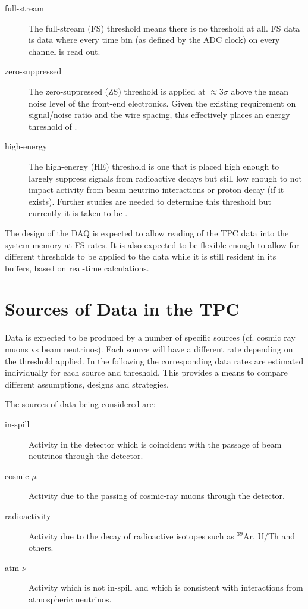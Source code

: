 \begin{description}
\item[full-stream] The full-stream (FS) threshold means there is no threshold at all.
FS data is data where every time bin (as defined by the ADC clock) on every channel is read out.
\item[zero-suppressed] The zero-suppressed (ZS) threshold is applied
  at $\approx 3\sigma$ above the mean noise level of the front-end electronics.
  Given the existing requirement on signal/noise ratio and the wire spacing,
  this effectively places an energy threshold of  \chargezsthreshold.
\item[high-energy] The high-energy (HE) threshold is one that is
  placed high enough to largely suppress signals from radioactive decays but still
  low enough to not impact activity from beam neutrino interactions or proton decay (if it exists).
  Further studies are needed to determine this threshold but currently it is taken to be
  \chargehethreshold.
\end{description}

The design of the DAQ is expected to allow reading of the TPC data into the system memory at  FS rates.
It is also expected to be flexible enough to allow for different
thresholds to be applied to the data while it is still resident in its buffers, based on real-time calculations.

\section{Sources of Data in the TPC}

Data is expected to be produced by a number of specific sources (cf. cosmic ray muons vs beam neutrinos).
Each source will have a different rate depending on the threshold applied.
In the following the corresponding data rates are estimated individually for each source and threshold.
This provides a means to compare different assumptions, designs and strategies.

The sources of data being considered are:

\begin{description}
\item[in-spill] Activity in the detector which is coincident with the passage of beam neutrinos through the detector.
\item[cosmic-$\mu$] Activity due to the  passing of cosmic-ray muons through the detector.
\item[radioactivity] Activity due to the decay of radioactive isotopes such as $^{39}$Ar,  U/Th and others.
\item[atm-$\nu$] Activity which is not in-spill and which is
  consistent with interactions from atmospheric neutrinos.
\end{description}

